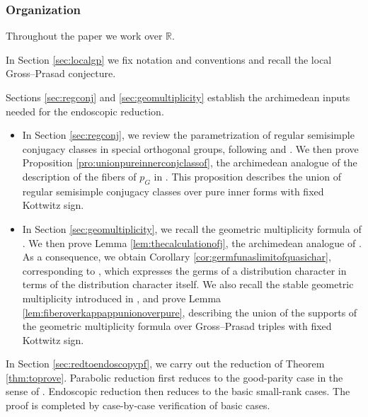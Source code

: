 \documentclass[12pt]{amsart}
\numberwithin{equation}{subsection}
\newcommand{\BR}{{\mathbb {R}}}
\begin{document}
\subsubsection{Organization}

Throughout the paper we work over $\BR$.

In Section \ref{sec:localgp} we fix notation and conventions and recall the local Gross--Prasad conjecture.

Sections \ref{sec:regconj} and \ref{sec:geomultiplicity} establish the
archimedean inputs needed for the endoscopic reduction.

\begin{itemize}
    \item
    In Section \ref{sec:regconj}, we review the parametrization of regular
    semisimple conjugacy classes in special orthogonal groups, following
    \cite[\S 1.3]{MR2672539} and \cite[\S 1.3, \S 1.4]{MR3155345}. We then
    prove Proposition \ref{pro:unionpureinnerconjclassof}, the archimedean
    analogue of the description of the fibers of $p_G$ in
    \cite[\S 1.4]{MR3155345}. This proposition describes the union of regular
    semisimple conjugacy classes over pure inner forms with fixed Kottwitz
    sign.

    \item
    In Section \ref{sec:geomultiplicity}, we recall the geometric multiplicity
    formula of \cite{thesis_zhilin}. We then prove
    Lemma \ref{lem:thecalculationofj}, the archimedean analogue of
    \cite[Lem.~13.4~(ii)]{waldspurger10}. As a consequence, we obtain
    Corollary \ref{cor:germfunaslimitofquasichar}, corresponding to
    \cite[\S 13.6]{waldspurger10}, which expresses the germs of a distribution
    character in terms of the distribution character itself. We also recall the
    stable geometric multiplicity introduced in \cite[\S 3.2]{MR3155345}, and
    prove Lemma \ref{lem:fiberoverkappappunionoverpure}, describing the union
    of the supports of the geometric multiplicity formula over Gross--Prasad
    triples with fixed Kottwitz sign.
\end{itemize}

In Section \ref{sec:redtoendoscopypf}, we carry out the reduction of
Theorem \ref{thm:toprove}. Parabolic reduction first reduces to the good-parity
case in the sense of \cite[\S 4.1]{moeglin2020paquets}. Endoscopic reduction
then reduces to the basic small-rank cases. The proof is completed by case-by-case verification of basic cases.
\end{document}
